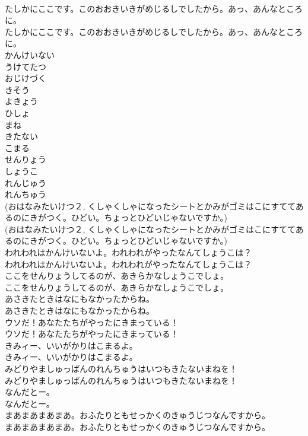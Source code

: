 \documentclass[8pt]{extreport}
\begin{document}
\begin{CJK}{UTF8}{min}
\\	たしかにここです。このおおきいきがめじるしでしたから。あっ、あんなところに。
\\	たしかにここです。このおおきいきがめじるしでしたから。あっ、あんなところに。
\\	かんけいない
\\	うけてたつ
\\	おじけづく
\\	きそう
\\	よきょう
\\	ひしょ
\\	まね
\\	きたない
\\	こまる
\\	せんりょう
\\	しょうこ
\\	れんじゅう 
\\	れんちゅう
\\	(おはなみたいけつ２, くしゃくしゃになったシートとかみがゴミはこにすててあるのにきがつく。ひどい。ちょっとひどいじゃないですか。)
\\	(おはなみたいけつ２, くしゃくしゃになったシートとかみがゴミはこにすててあるのにきがつく。ひどい。ちょっとひどいじゃないですか。)
\\	われわれはかんけいないよ。われわれがやったなんてしょうこは？
\\	われわれはかんけいないよ。われわれがやったなんてしょうこは？
\\	ここをせんりょうしてるのが、あきらかなしょうこでしょ。
\\	ここをせんりょうしてるのが、あきらかなしょうこでしょ。
\\	あさきたときはなにもなかったからね。
\\	あさきたときはなにもなかったからね。
\\	ウソだ！あなたたちがやったにきまっている！
\\	ウソだ！あなたたちがやったにきまっている！
\\	きみィー、いいがかりはこまるよ。
\\	きみィー、いいがかりはこまるよ。
\\	みどりやましゅっぱんのれんちゅうはいつもきたないまねを！
\\	みどりやましゅっぱんのれんちゅうはいつもきたないまねを！
\\	なんだとー。
\\	なんだとー。
\\	まあまあまあまあ。おふたりともせっかくのきゅうじつなんですから。
\\	まあまあまあまあ。おふたりともせっかくのきゅうじつなんですから。

\end{CJK}
\end{document}
